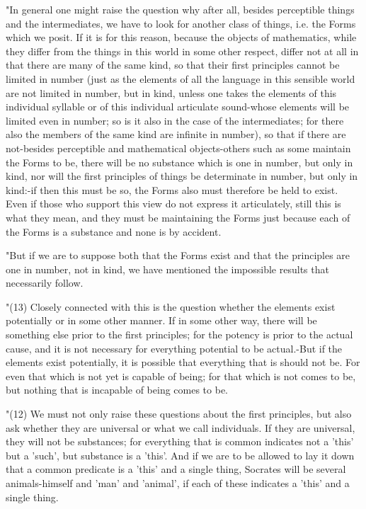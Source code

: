 "In general one might raise the question why after all, besides perceptible
things and the intermediates, we have to look for another class of
things, i.e. the Forms which we posit. If it is for this reason, because
the objects of mathematics, while they differ from the things in this
world in some other respect, differ not at all in that there are many
of the same kind, so that their first principles cannot be limited
in number (just as the elements of all the language in this sensible
world are not limited in number, but in kind, unless one takes the
elements of this individual syllable or of this individual articulate
sound-whose elements will be limited even in number; so is it also
in the case of the intermediates; for there also the members of the
same kind are infinite in number), so that if there are not-besides
perceptible and mathematical objects-others such as some maintain
the Forms to be, there will be no substance which is one in number,
but only in kind, nor will the first principles of things be determinate
in number, but only in kind:-if then this must be so, the Forms also
must therefore be held to exist. Even if those who support this view
do not express it articulately, still this is what they mean, and
they must be maintaining the Forms just because each of the Forms
is a substance and none is by accident. 

"But if we are to suppose both that the Forms exist and that the principles
are one in number, not in kind, we have mentioned the impossible results
that necessarily follow. 

"(13) Closely connected with this is the question whether the elements
exist potentially or in some other manner. If in some other way, there
will be something else prior to the first principles; for the potency
is prior to the actual cause, and it is not necessary for everything
potential to be actual.-But if the elements exist potentially, it
is possible that everything that is should not be. For even that which
is not yet is capable of being; for that which is not comes to be,
but nothing that is incapable of being comes to be. 

"(12) We must not only raise these questions about the first principles,
but also ask whether they are universal or what we call individuals.
If they are universal, they will not be substances; for everything
that is common indicates not a 'this' but a 'such', but substance
is a 'this'. And if we are to be allowed to lay it down that a common
predicate is a 'this' and a single thing, Socrates will be several
animals-himself and 'man' and 'animal', if each of these indicates
a 'this' and a single thing. 

